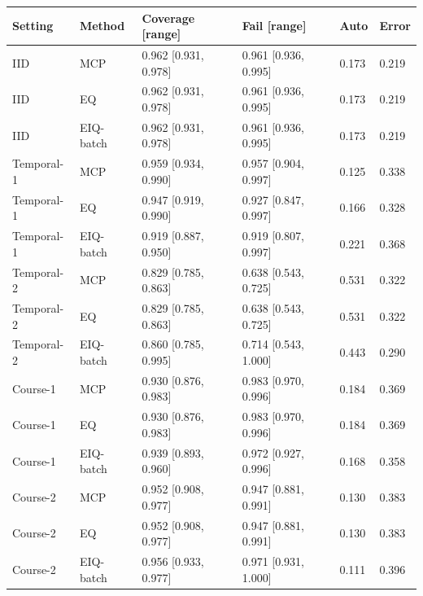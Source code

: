 \begin{tabular}{llllll}
\toprule
Setting & Method & Coverage [range] & Fail [range] & Auto & Error\\
\midrule
IID & MCP & 0.962 [0.931, 0.978] & 0.961 [0.936, 0.995] & 0.173 & 0.219\\
IID & EQ & 0.962 [0.931, 0.978] & 0.961 [0.936, 0.995] & 0.173 & 0.219\\
IID & EIQ-batch & 0.962 [0.931, 0.978] & 0.961 [0.936, 0.995] & 0.173 & 0.219\\
Temporal-1 & MCP & 0.959 [0.934, 0.990] & 0.957 [0.904, 0.997] & 0.125 & 0.338\\
Temporal-1 & EQ & 0.947 [0.919, 0.990] & 0.927 [0.847, 0.997] & 0.166 & 0.328\\
Temporal-1 & EIQ-batch & 0.919 [0.887, 0.950] & 0.919 [0.807, 0.997] & 0.221 & 0.368\\
Temporal-2 & MCP & 0.829 [0.785, 0.863] & 0.638 [0.543, 0.725] & 0.531 & 0.322\\
Temporal-2 & EQ & 0.829 [0.785, 0.863] & 0.638 [0.543, 0.725] & 0.531 & 0.322\\
Temporal-2 & EIQ-batch & 0.860 [0.785, 0.995] & 0.714 [0.543, 1.000] & 0.443 & 0.290\\
Course-1 & MCP & 0.930 [0.876, 0.983] & 0.983 [0.970, 0.996] & 0.184 & 0.369\\
Course-1 & EQ & 0.930 [0.876, 0.983] & 0.983 [0.970, 0.996] & 0.184 & 0.369\\
Course-1 & EIQ-batch & 0.939 [0.893, 0.960] & 0.972 [0.927, 0.996] & 0.168 & 0.358\\
Course-2 & MCP & 0.952 [0.908, 0.977] & 0.947 [0.881, 0.991] & 0.130 & 0.383\\
Course-2 & EQ & 0.952 [0.908, 0.977] & 0.947 [0.881, 0.991] & 0.130 & 0.383\\
Course-2 & EIQ-batch & 0.956 [0.933, 0.977] & 0.971 [0.931, 1.000] & 0.111 & 0.396\\
\bottomrule
\end{tabular}